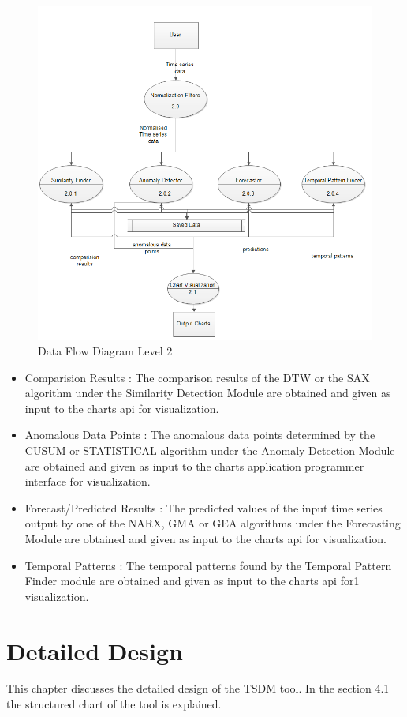 \documentclass[12pt,a4paper]{report}
\begin{document}
\begin{figure}[h!]
	\centering
		\includegraphics[scale=0.8]{screenshots/dfd_2.png}
		\caption{Data Flow Diagram Level 2}
\end{figure}
\begin{itemize}
\item Comparision Results  : The comparison results of the DTW or the SAX algorithm under the Similarity Detection Module are obtained and given as input to the charts api for visualization.
\item Anomalous Data Points  : The anomalous data points determined by the CUSUM or STATISTICAL algorithm under the Anomaly Detection Module are obtained and given as input to the charts application programmer interface for visualization.
\item Forecast/Predicted Results  : The predicted values of the input time series output by one of the NARX, GMA or GEA algorithms under the Forecasting Module are obtained and given as input to the charts api for visualization.
\item Temporal Patterns  : The temporal patterns found by the Temporal Pattern Finder module are obtained and given as input to the charts api for1 visualization.

\end{itemize}
\chapter{Detailed Design}
\pagestyle{fancy}
\chead{}
\rfoot{\small{\thepage}}
\renewcommand{\headrulewidth}{0.4pt}
\renewcommand{\footrulewidth}{0.4pt}
This chapter discusses the detailed design of the TSDM tool. In the section 4.1 the structured chart of the tool is explained.
\end{document}
